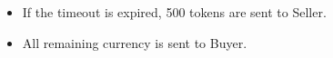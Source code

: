 \begin{itemize}
\begin{enumerate}
\begin{itemize}
        \item If the timeout is expired, 500 tokens are sent to Seller.

        \item All remaining currency is sent to Buyer.
      \end{itemize}
  \end{enumerate}

\end{itemize}
